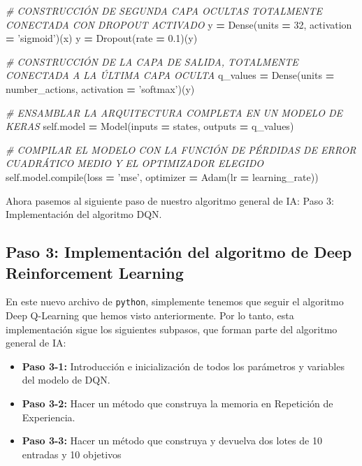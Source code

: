 \documentclass[]{book}
\newenvironment{Shaded}{\begin{snugshade}}{\end{snugshade}}
\newcommand{\BuiltInTok}[1]{#1}
\newcommand{\CommentTok}[1]{\textcolor[rgb]{0.56,0.35,0.01}{\textit{#1}}}
\newcommand{\DecValTok}[1]{\textcolor[rgb]{0.00,0.00,0.81}{#1}}
\newcommand{\FloatTok}[1]{\textcolor[rgb]{0.00,0.00,0.81}{#1}}
\newcommand{\NormalTok}[1]{#1}
\newcommand{\OperatorTok}[1]{\textcolor[rgb]{0.81,0.36,0.00}{\textbf{#1}}}
\newcommand{\StringTok}[1]{\textcolor[rgb]{0.31,0.60,0.02}{#1}}
\newcommand{\VariableTok}[1]{\textcolor[rgb]{0.00,0.00,0.00}{#1}}
\providecommand{\tightlist}{%
  \setlength{\itemsep}{0pt}\setlength{\parskip}{0pt}}
\begin{document}
\begin{Shaded}
\begin{Highlighting}[]
        \CommentTok{# CONSTRUCCIÓN DE SEGUNDA CAPA OCULTAS TOTALMENTE CONECTADA CON DROPOUT ACTIVADO}
\NormalTok{        y }\OperatorTok{=}\NormalTok{ Dense(units }\OperatorTok{=} \DecValTok{32}\NormalTok{, activation }\OperatorTok{=} \StringTok{'sigmoid'}\NormalTok{)(x)}
\NormalTok{        y }\OperatorTok{=}\NormalTok{ Dropout(rate }\OperatorTok{=} \FloatTok{0.1}\NormalTok{)(y)}

        \CommentTok{# CONSTRUCCIÓN DE LA CAPA DE SALIDA, TOTALMENTE CONECTADA A LA ÚLTIMA CAPA OCULTA}
\NormalTok{        q_values }\OperatorTok{=}\NormalTok{ Dense(units }\OperatorTok{=}\NormalTok{ number_actions, activation }\OperatorTok{=} \StringTok{'softmax'}\NormalTok{)(y)}

        \CommentTok{# ENSAMBLAR LA ARQUITECTURA COMPLETA EN UN MODELO DE KERAS}
        \VariableTok{self}\NormalTok{.model }\OperatorTok{=}\NormalTok{ Model(inputs }\OperatorTok{=}\NormalTok{ states, outputs }\OperatorTok{=}\NormalTok{ q_values)}

        \CommentTok{# COMPILAR EL MODELO CON LA FUNCIÓN DE PÉRDIDAS DE ERROR CUADRÁTICO MEDIO Y EL OPTIMIZADOR ELEGIDO}
        \VariableTok{self}\NormalTok{.model.}\BuiltInTok{compile}\NormalTok{(loss }\OperatorTok{=} \StringTok{'mse'}\NormalTok{, optimizer }\OperatorTok{=}\NormalTok{ Adam(lr }\OperatorTok{=}\NormalTok{ learning_rate))}
\end{Highlighting}
\end{Shaded}

Ahora pasemos al siguiente paso de nuestro algoritmo general de IA: Paso 3: Implementación del algoritmo DQN.

\hypertarget{paso-3-implementaciuxf3n-del-algoritmo-de-deep-reinforcement-learning}{%
\subsection{Paso 3: Implementación del algoritmo de Deep Reinforcement Learning}\label{paso-3-implementaciuxf3n-del-algoritmo-de-deep-reinforcement-learning}}

En este nuevo archivo de \texttt{python}, simplemente tenemos que seguir el algoritmo Deep Q-Learning que hemos visto anteriormente. Por lo tanto, esta implementación sigue los siguientes subpasos, que forman parte del algoritmo general de IA:

\begin{itemize}
\tightlist
\item
  \textbf{Paso 3-1:} Introducción e inicialización de todos los parámetros y variables del modelo de DQN.
\item
  \textbf{Paso 3-2:} Hacer un método que construya la memoria en Repetición de Experiencia.
\item
  \textbf{Paso 3-3:} Hacer un método que construya y devuelva dos lotes de 10 entradas y 10 objetivos
\end{itemize}
\end{document}

